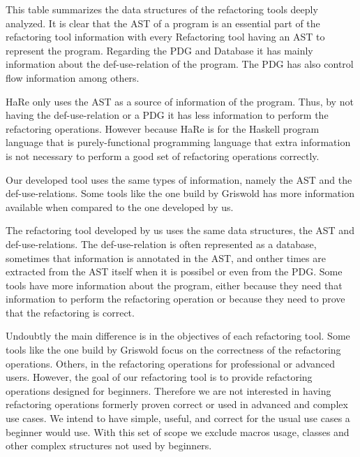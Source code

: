 This table summarizes the data structures of the refactoring tools deeply analyzed.
It is clear that the AST of a program is an essential part of the refactoring
tool information with every Refactoring tool having an AST to represent the program.
Regarding the PDG and Database it has mainly information about the def-use-relation
of the program. The PDG has also control flow information among others.

HaRe only uses the AST as a source of information of the program. Thus, by not having
the def-use-relation or a PDG it has less information to perform the refactoring operations.
However because HaRe is for the Haskell program language that is purely-functional
programming language that extra information is not necessary to perform a good set of
refactoring operations correctly.



Our developed tool uses the same types of information, namely the AST and the def-use-relations.
Some tools like the one build by Griswold has more information available when compared
to the one developed by us.

The refactoring tool developed by us uses the same data structures, the AST and
def-use-relations. The def-use-relation is often represented as a database, sometimes
that information is annotated in the AST, %
and onther times are extracted from the AST itself when it is possibel or even
from the PDG.
Some tools have more information about the program, either because they need that
information to perform the refactoring operation or because they need to prove that
the refactoring is correct.  %

Undoubtly the main difference is in the objectives of each refactoring tool.
Some tools like the one build by Griswold focus on the correctness of the refactoring
operations.
Others, in the refactoring operations for professional or advanced users.
However, the goal of our refactoring tool is to provide refactoring operations
designed for beginners. %
Therefore we are not interested in having refactoring operations formerly proven %
correct or used in advanced and complex use cases. %
We intend to have simple, useful, and correct for the usual use cases a beginner would use.
With this set of scope we exclude macros usage, classes and other complex structures %
not used by beginners.


